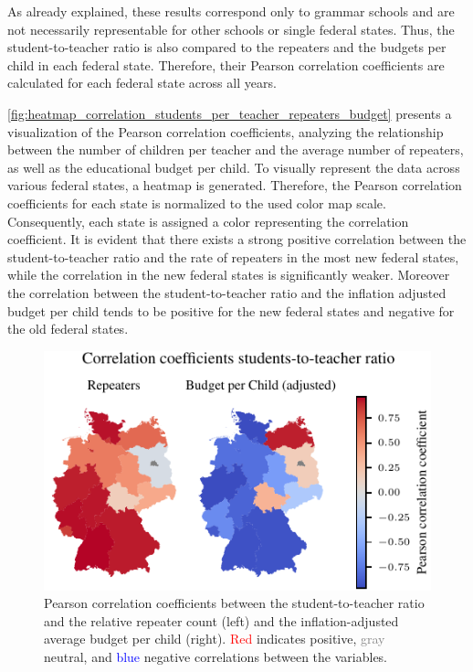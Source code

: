 As already explained, these results correspond only to grammar schools and are not necessarily representable for other schools or single federal states. Thus, the student-to-teacher ratio is also compared to the repeaters and the budgets per child in each federal state. Therefore, their Pearson correlation coefficients are calculated for each federal state across all years. 

\autoref{fig:heatmap_correlation_students_per_teacher_repeaters_budget} presents a visualization of the Pearson correlation coefficients, analyzing the relationship between the number of children per teacher and the average number of repeaters, as well as the educational budget per child. To visually represent the data across various federal states, a heatmap is generated. Therefore, the Pearson correlation coefficients for each state is normalized to the used color map scale. Consequently, each state is assigned a color representing the correlation coefficient. It is evident that there exists a strong positive correlation between the student-to-teacher ratio and the rate of repeaters in the most new federal states, while the correlation in the new federal states is significantly weaker. Moreover the correlation between the student-to-teacher ratio and the inflation adjusted budget per child tends to be positive for the new federal states and negative for the old federal states.

\begin{figure}[h]
    \centering
    \includegraphics{fig/fig_heatmap_correlation_students_per_teacher_repeaters_budget.pdf}
    \caption{Pearson correlation coefficients between the student-to-teacher ratio and the relative repeater count (left) and the inflation-adjusted average budget per child (right). \textcolor{red}{Red} indicates positive, \textcolor{gray}{gray} neutral, and \textcolor{blue}{blue} negative correlations between the variables.}
    \label{fig:heatmap_correlation_students_per_teacher_repeaters_budget}
\end{figure}

